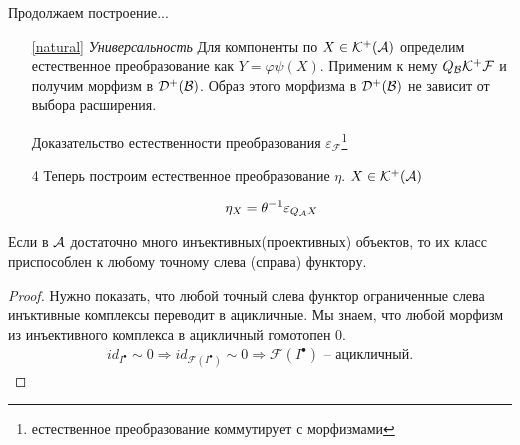 \documentclass[../main.tex]{subfiles}
\begin{document}
\eee
Продолжаем построение...
\begin{itemize}
\item[ \ref{natural}] \textit{Универсальность}
Для компоненты по $X \in \mathcal{K^+(A)}$ определим естественное преобразование как  $Y = \varphi\psi (X)$. Применим к нему $Q_{\mathcal{B}}\mathcal{K^+ F}$ и получим морфизм в $\mathcal{D^+(B)}$. Образ этого морфизма в $\mathcal{D^+(B)}$ не зависит от выбора расширения.
\bee
{}
\eee
Доказательство естественности преобразования $\varepsilon_{\mathcal{F}}$\footnote{естественное преобразование коммутирует с морфизмами}
\bee
{}
\eee
\bee
{}
\eee
\item[4]Теперь построим естественное преобразование $\eta$. $X\in\mathcal{K^+(A)}$
\bee
{}    
 \eee
 \begin{align*}
     \eta_{X} = \theta^{-1}\varepsilon_{Q_{\mathcal{A}}X}
 \end{align*}
 \end{itemize}
 \begin{to_claim}
Если в $\mathcal{A}$ достаточно много инъективных(проективных) объектов, то их класс приспособлен к любому точному слева (справа) функтору.
 \end{to_claim}
 \begin{proof}
 Нужно показать, что любой точный слева функтор ограниченные слева инъктивные комплексы переводит в ацикличные. Мы знаем, что любой морфизм из инъективного комплекса в ацикличный гомотопен 0. 
 \begin{align*}
     id_{I^\bullet} \sim 0 \Rightarrow id_{\mathcal{F}(I^\bullet)}\sim 0 \Rightarrow \mathcal{F}(I^\bullet) \text{ -- ацикличный.}
 \end{align*}
 \end{proof}
\end{document}
